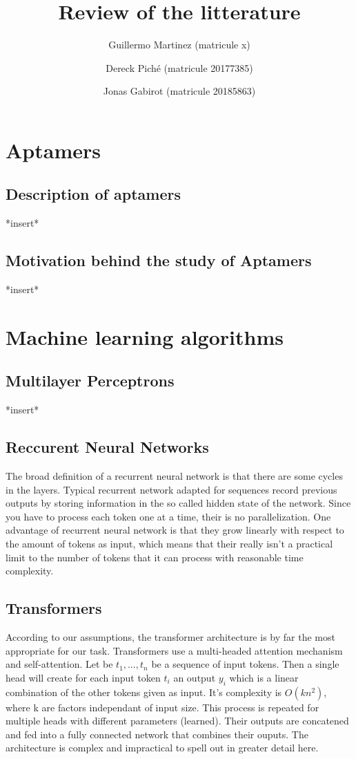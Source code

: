 \documentclass{article}
\title{Review of the litterature}
\author
{
    Guillermo Martinez (matricule x)
    \and
    Dereck Piché (matricule 20177385)
    \and
    Jonas Gabirot (matricule 20185863)
}
\begin{document}
\maketitle

\section*{Aptamers}
\subsection*{Description of aptamers}
*insert*
\subsection*{Motivation behind the study of Aptamers}
*insert*

\section*{Machine learning algorithms}
\subsection*{Multilayer Perceptrons}
*insert*
\subsection*{Reccurent Neural Networks}
The broad definition of a recurrent neural network 
is that there are some cycles in the layers. 
Typical recurrent network adapted for sequences 
record previous outputs by storing information in the so called
hidden state of the network. Since you have to process each token one at 
a time, their is no parallelization. 
One advantage of recurrent neural network is that they grow 
linearly with respect to the amount of tokens as input, which means 
that their really isn't a practical limit to the number of tokens that
it can process with reasonable time complexity. 
\subsection*{Transformers}
According to our assumptions, the transformer 
architecture \cite{transformers} is by far the most appropriate
for our task. Transformers use a multi-headed 
attention mechanism and self-attention. Let
be $t_1, \dots, t_n$ be a sequence of input tokens. Then a single 
head will create for each input token $t_i$ an output $y_i$ which is a 
linear combination of the other tokens given as input. It's complexity
is $O(kn^2)$, where k are factors independant of input size. This process is 
repeated for multiple heads with different parameters (learned). Their
outputs are concatened and fed into a fully connected network that combines 
their ouputs. The architecture is complex and impractical to spell out
in greater detail here.
\end{document}
